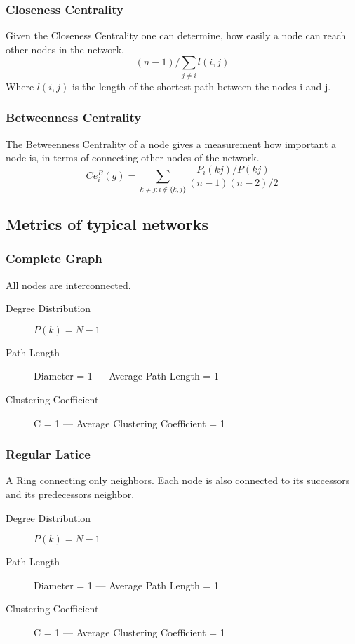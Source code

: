 	\subsubsection{Closeness Centrality} %
	\label{ssub:closeness_centrality}
		Given the Closeness Centrality one can determine,
		how easily a node can reach other nodes in the network.
		\begin{equation}
		\label{eq:closenesscentrality}
			(n-1) / \sum_{j\neq i} l(i,j)
		\end{equation}
		Where $l(i,j)$ is the length of the shortest path between the nodes i and j.

	\subsubsection{Betweenness Centrality} %
	\label{ssub:betweenness_centrality}
		The Betweenness Centrality of a node gives a measurement how important a node is,
		in terms of connecting other nodes of the network.
		\begin{equation}
		\label{eq:betweennesscentrality}
			Ce_i^B (g) = \sum_{k\neq j:i\notin\{k,j\}} \frac{P_i(kj)/P(kj)}{(n-1)(n-2)/2}
		\end{equation}	

\subsection{Metrics of typical networks} %
\label{sub:metrics_of_typical_networks}

	\subsubsection{Complete Graph} %
	\label{ssub:complete_graph}
	All nodes are interconnected.
		\begin{description}
			\item[Degree Distribution] $P(k) = N-1$
			\item[Path Length] Diameter = 1 --- Average Path Length = 1
			\item[Clustering Coefficient] C = 1 --- Average Clustering Coefficient = 1
		\end{description}

	\subsubsection*{Regular Latice} %
	\label{ssub:regular_latice}
	A Ring connecting only neighbors.
	Each node is also connected to its successors and its predecessors neighbor.
	\begin{description}
			\item[Degree Distribution] $P(k) = N-1$
			\item[Path Length] Diameter = 1 --- Average Path Length = 1
			\item[Clustering Coefficient] C = 1 --- Average Clustering Coefficient = 1
		\end{description}

